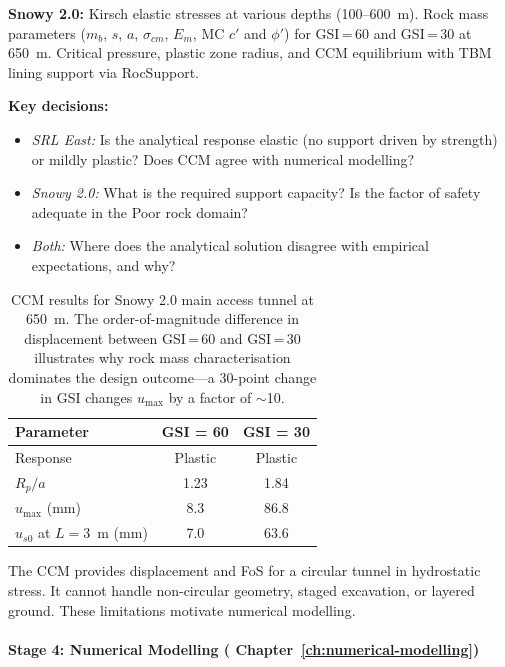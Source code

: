 \textbf{Snowy 2.0:} Kirsch elastic stresses at various depths (100--600~m). Rock mass parameters ($m_b$, $s$, $a$, $\sigma_{cm}$, $E_m$, MC $c'$ and $\phi'$) for GSI\,=\,60 and GSI\,=\,30 at 650~m. Critical pressure, plastic zone radius, and CCM equilibrium with TBM lining support via RocSupport.

\textbf{Key decisions:}
\begin{itemize}[nosep]
 \item \textit{SRL East:} Is the analytical response elastic (no support driven by strength) or mildly plastic? Does CCM agree with numerical modelling?
 \item \textit{Snowy 2.0:} What is the required support capacity? Is the factor of safety adequate in the Poor rock domain?
 \item \textit{Both:} Where does the analytical solution disagree with empirical expectations, and why?
\end{itemize}

\begin{table}[h!]
\centering
\small
\begin{tabular}{l c c}
\toprule
\textbf{Parameter} & \textbf{GSI = 60} & \textbf{GSI = 30} \\
\midrule
Response & Plastic & Plastic \\
$R_p/a$ & 1.23 & 1.84 \\
$u_{\max}$ (mm) & 8.3 & 86.8 \\
$u_{s0}$ at $L=3$~m (mm) & 7.0 & 63.6 \\
\bottomrule
\end{tabular}
\caption{CCM results for Snowy 2.0 main access tunnel at 650~m. The order-of-magnitude difference in displacement between GSI\,=\,60 and GSI\,=\,30 illustrates why rock mass characterisation dominates the design outcome---a 30-point change in GSI changes $u_{\max}$ by a factor of $\sim$10.}
\end{table}

\begin{notebox}
The CCM provides displacement and FoS for a circular tunnel in hydrostatic stress. It cannot handle non-circular geometry, staged excavation, or layered ground. These limitations motivate numerical modelling.
\end{notebox}

\paragraph{Stage 4: Numerical Modelling ( Chapter~\ref{ch:numerical-modelling})}

